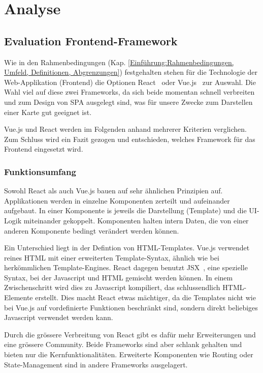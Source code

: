
\section{Analyse}
\label{Analyse}


\subsection{Evaluation Frontend-Framework}
\label{Analyse:Evaluation Frontend-Framework}

Wie in den Rahmenbedingungen (Kap. \ref{Einführung:Rahmenbedingungen, Umfeld, Definitionen, Abgrenzungen}) festgehalten stehen für die Technologie der Web-Applikation (Frontend) die Optionen React~\cite{react} oder Vue.js~\cite{vuejs} zur Auswahl.
Die Wahl viel auf diese zwei Frameworks, da sich beide momentan schnell verbreiten und zum Design von \ac{SPA} ausgelegt sind, was für unsere Zwecke zum Darstellen einer Karte gut geeignet ist.

Vue.js und React werden im Folgenden anhand mehrerer Kriterien verglichen.
Zum Schluss wird ein Fazit gezogen und entschieden, welches Framework für das Frontend eingesetzt wird.

\subsubsection{Funktionsumfang}
\label{Analyse Framework:Funktionsumfang}

Sowohl React als auch Vue.js bauen auf sehr ähnlichen Prinzipien auf.
Applikationen werden in einzelne Komponenten zerteilt und aufeinander aufgebaut.
In einer Komponente is jeweils die Darstellung (Template) und die UI-Logik miteinander gekoppelt.
Komponenten halten intern Daten, die von einer anderen Komponente bedingt verändert werden können.

Ein Unterschied liegt in der Defintion von HTML-Templates.
Vue.js verwendet reines HTML mit einer erweiterten Template-Syntax, ähnlich wie bei herkömmlichen Template-Engines.
React dagegen benutzt JSX~\cite{jsx}, eine spezielle Syntax, bei der Javascript und HTML gemischt werden können.
In einem Zwischenschritt wird dies zu Javascript kompiliert, das schlussendlich HTML-Elemente erstellt.
Dies macht React etwas mächtiger, da die Templates nicht wie bei Vue.js auf vordefinierte Funktionen beschränkt sind, sondern direkt beliebiges Javascript verwendet werden kann.

Durch die grössere Verbreitung von React gibt es dafür mehr Erweiterungen und eine grössere Community.
Beide Frameworks sind aber schlank gehalten und bieten nur die Kernfunktionalitäten.
Erweiterte Komponenten wie Routing oder State-Management sind in andere Frameworks ausgelagert.

